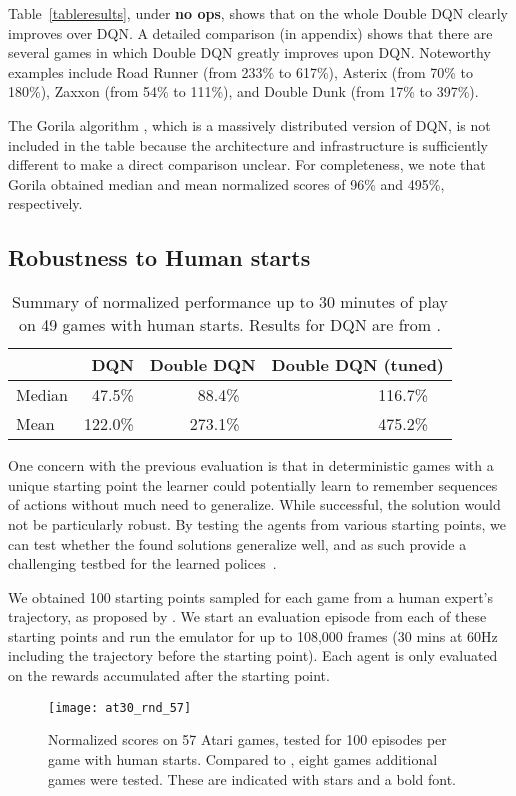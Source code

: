 \documentclass[letterpaper]{article}
\begin{document}
Table~\ref{tableresults}, under \textbf{no ops}, shows that on the whole Double DQN clearly improves over DQN.
A detailed comparison (in appendix) shows that there are several games in which Double DQN greatly improves upon DQN.  Noteworthy examples include Road Runner (from 233\% to 617\%), Asterix (from 70\% to 180\%), Zaxxon (from 54\% to 111\%), and Double Dunk (from 17\% to 397\%).


The Gorila algorithm \citep{Nair:2015}, which is a massively distributed version of DQN, is not included in the table because the architecture and infrastructure is sufficiently different to make a direct comparison unclear.  For completeness, we note that Gorila obtained median and mean normalized scores of 96\% and 495\%, respectively.

\subsection{Robustness to Human starts}
\label{sec:result:human_starts}
\begin{table}[t]
\centering
 \def\arraystretch{1.1}
 \begin{tabular}{|l|rrr|}
  \hline
  		        &\small DQN  & \small Double DQN  	& \small Double DQN (tuned) \\ \hline 
 \small Median  &\small ~47.5\% 	& \small ~88.4\%~~      & \small 116.7\%~~       \\ \hline 
 \small Mean    &\small 122.0\% 	& \small 273.1\%~~ 	    & \small 475.2\%~~ 	    \\ \hline 
 \end{tabular}
\caption{\small Summary of normalized performance up to 30 minutes of play on 49 games with human starts. Results for DQN are from \citet{Nair:2015}.}
\label{tableresults_at30_rnd_starts}
\end{table}

One concern with the previous evaluation is that in deterministic games with a
unique starting point the learner could potentially learn to remember sequences of actions without
much need to generalize. While successful, the solution would
not be particularly robust.  By testing the agents from various starting points,
we can test whether the found solutions generalize well, and as such provide a
challenging testbed for the learned polices~\citep{Nair:2015}.

We obtained 100 starting points sampled for each game from a human
expert's trajectory, as proposed by \citet{Nair:2015}. We start an
evaluation episode from each of these starting points and run the emulator for
up to 108,000 frames (30 mins at 60Hz including the trajectory before the
starting point). Each agent is only evaluated on the rewards accumulated after
the starting point.
\begin{figure}[t]
\begin{center}
\texttt{[image: at30\_rnd\_57]}
\caption{ \label{at30_rnd_fig} {Normalized scores on 57 Atari games, tested for 100 episodes per game with human starts.  Compared to \citet{Mnih:2015}, eight games additional games were tested.  These are indicated with stars and a bold font.}}
\end{center}
\end{figure}
\end{document}
